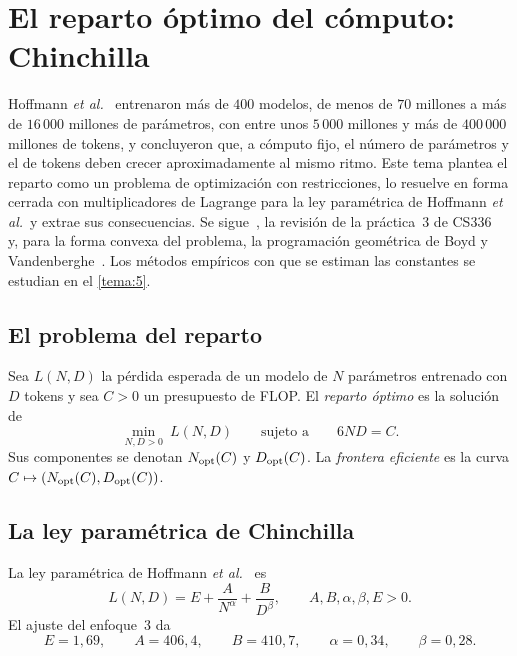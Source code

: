 \chapter{El reparto óptimo del cómputo: Chinchilla}
\label{tema:4}

Hoffmann \emph{et al.}~\cite{hoffmann} entrenaron más de $400$ modelos, de menos de $70$ millones a más de $16\,000$ millones de parámetros, con entre unos $5\,000$ millones y más de $400\,000$ millones de tokens, y concluyeron que, a cómputo fijo, el número de parámetros y el de tokens deben crecer aproximadamente al mismo ritmo. Este tema plantea el reparto como un problema de optimización con restricciones, lo resuelve en forma cerrada con multiplicadores de Lagrange para la ley paramétrica de Hoffmann \emph{et al.}\ y extrae sus consecuencias. Se sigue~\cite[§3.3, ecuaciones~(2) y~(4), y apéndice~D.2]{hoffmann}, la revisión de la práctica~3 de CS336~\cite[§2]{cs336a3} y, para la forma convexa del problema, la programación geométrica de Boyd y Vandenberghe~\cite[§4.5]{bv}. Los métodos empíricos con que se estiman las constantes se estudian en el \cref{tema:5}.

\section{El problema del reparto}

\begin{definicion}\label{def:reparto}
Sea $L(N,D)$ la pérdida esperada de un modelo de $N$ parámetros entrenado con $D$ tokens y sea $C>0$ un presupuesto de FLOP. El \emph{reparto óptimo} es la solución de
\[
\min_{N,D>0}\ L(N,D)\qquad\text{sujeto a}\qquad 6ND=C.
\]
Sus componentes se denotan $N_{\mathrm{opt}}(C)$ y $D_{\mathrm{opt}}(C)$. La \emph{frontera eficiente} es la curva $C\mapsto(N_{\mathrm{opt}}(C),D_{\mathrm{opt}}(C))$.
\end{definicion}

\section{La ley paramétrica de Chinchilla}

\begin{definicion}\label{def:chinchilla}
La ley paramétrica de Hoffmann \emph{et al.}~\cite[ecuación~(2)]{hoffmann} es
\[
L(N,D)=E+\frac{A}{N^{\alpha}}+\frac{B}{D^{\beta}},\qquad A,B,\alpha,\beta,E>0.
\]
El ajuste del enfoque~3 da~\cite[apéndice~D.2]{hoffmann}
\[
E=1{,}69,\qquad A=406{,}4,\qquad B=410{,}7,\qquad\alpha=0{,}34,\qquad\beta=0{,}28.
\]
\end{definicion}

